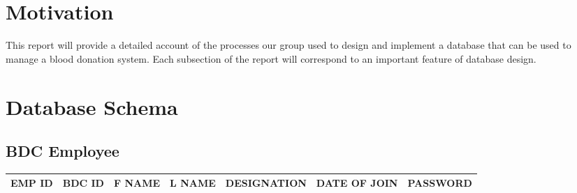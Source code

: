 




\section{Motivation}

This report will provide a detailed account of the processes our group
used to design and implement a database that can be used to manage
a blood donation system. Each subsection of the report will correspond to an
important feature of database design.

\section{Database Schema}

\subsection{BDC Employee}

\begin{tabular}{ | c | c | c | c | c | c | c | }
 \hline
 EMP ID & BDC ID & F NAME & L NAME & DESIGNATION & DATE OF JOIN & PASSWORD \\
 \hline
\end{tabular}

